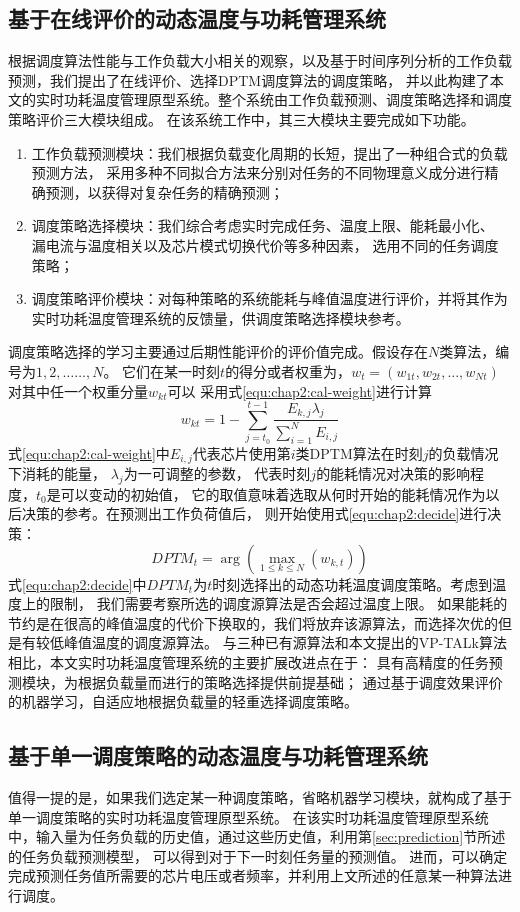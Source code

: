 \subsection{基于在线评价的动态温度与功耗管理系统}
根据调度算法性能与工作负载大小相关的观察，以及基于时间序列分析的工作负载预测，我们提出了在线评价、选择DPTM调度算法的调度策略， 并以此构建了本文的实时功耗温度管理原型系统。整个系统由工作负载预测、调度策略选择和调度策略评价三大模块组成。
在该系统工作中，其三大模块主要完成如下功能。
\begin{enumerate}[1)]
\item 工作负载预测模块：我们根据负载变化周期的长短，提出了一种组合式的负载预测方法， 采用多种不同拟合方法来分别对任务的不同物理意义成分进行精确预测，以获得对复杂任务的精确预测；
\item 调度策略选择模块：我们综合考虑实时完成任务、温度上限、能耗最小化、 漏电流与温度相关以及芯片模式切换代价等多种因素， 选用不同的任务调度策略；
\item 调度策略评价模块：对每种策略的系统能耗与峰值温度进行评价，并将其作为实时功耗温度管理系统的反馈量，供调度策略选择模块参考。
\end{enumerate}

调度策略选择的学习主要通过后期性能评价的评价值完成。假设存在$N$类算法，编号为$1,2,……,N$。 它们在某一时刻$t$的得分或者权重为，$w_t=(w_{1t},w_{2t},...,w_{Nt})$对其中任一个权重分量$w_{kt}$可以 采用式\ref{equ:chap2:cal-weight}进行计算
\begin{equation}
\label{equ:chap2:cal-weight}
w_{kt} = 1- \sum\limits_{j=t_0}^{t-1} \frac{E_{k,j}\lambda_j}{\sum\limits_{i=1}^N E_{i,j}}
\end{equation}
式\ref{equ:chap2:cal-weight}中$E_{i,j}$代表芯片使用第$i$类DPTM算法在时刻$j$的负载情况下消耗的能量， $\lambda_{j}$为一可调整的参数， 代表时刻$j$的能耗情况对决策的影响程度，$t_0$是可以变动的初始值， 它的取值意味着选取从何时开始的能耗情况作为以后决策的参考。在预测出工作负荷值后， 则开始使用式\ref{equ:chap2:decide}进行决策：
\begin{equation}
\label{equ:chap2:decide}
DPTM_t = \arg(\max\limits_{1\le k \le N}(w_{k,t}))
\end{equation}
式\ref{equ:chap2:decide}中$DPTM_t$为$t$时刻选择出的动态功耗温度调度策略。考虑到温度上的限制， 我们需要考察所选的调度源算法是否会超过温度上限。 如果能耗的节约是在很高的峰值温度的代价下换取的，我们将放弃该源算法，而选择次优的但是有较低峰值温度的调度源算法。
与三种已有源算法和本文提出的VP-TALk算法相比，本文实时功耗温度管理系统的主要扩展改进点在于： 具有高精度的任务预测模块，为根据负载量而进行的策略选择提供前提基础； 通过基于调度效果评价的机器学习，自适应地根据负载量的轻重选择调度策略。

\subsection{基于单一调度策略的动态温度与功耗管理系统}
值得一提的是，如果我们选定某一种调度策略，省略机器学习模块，就构成了基于单一调度策略的实时功耗温度管理原型系统。 在该实时功耗温度管理原型系统中，输入量为任务负载的历史值，通过这些历史值，利用第\ref{sec:prediction}节所述的任务负载预测模型， 可以得到对于下一时刻任务量的预测值。 进而，可以确定完成预测任务值所需要的芯片电压或者频率，并利用上文所述的任意某一种算法进行调度。
